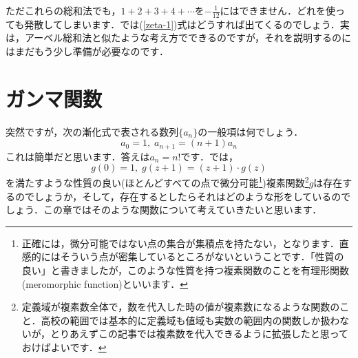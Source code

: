 \documentclass[./main]{subfile}
\begin{document}
ただこれらの総和法でも，$1+2+3+4+\cdots$を$-\frac{1}{12}$にはできません．どれを使っても発散してしまいます．では(\ref{zeta-1})式はどうすれば出てくるのでしょう．実は，アーベル総和法と似たような考え方でできるのですが，それを説明するのにはまだもう少し準備が必要なのです．

\section{ガンマ関数}

突然ですが，次の漸化式で表される数列$\{a_n\}$の一般項は何でしょう．
\[
a_0=1,\;a_{n+1}=(n+1)a_n
\]
これは簡単だと思います．答えは$a_n=n!$です．では，
\begin{equation}\label{gamma1}
g(0)=1,\;g(z+1)=(z+1)\cdot g(z)
\end{equation}
を満たすような性質の良い(ほとんどすべての点で微分可能\footnote{正確には，微分可能ではない点の集合が集積点を持たない，となります．直感的にはそういう点が密集しているところがないということです．「性質の良い」と書きましたが，このような性質を持つ複素関数のことを有理形関数(meromorphic function)といいます．})複素関数\footnote{定義域が複素数全体で，数を代入した時の値が複素数になるような関数のこと．高校の範囲では基本的に定義域も値域も実数の範囲内の関数しか扱わないが，とりあえずこの記事では複素数を代入できるように拡張したと思っておけばよいです．}$g$は存在するのでしょうか，そして，存在するとしたらそれはどのような形をしているのでしょう．この章ではそのような関数について考えていきたいと思います．
\end{document}
